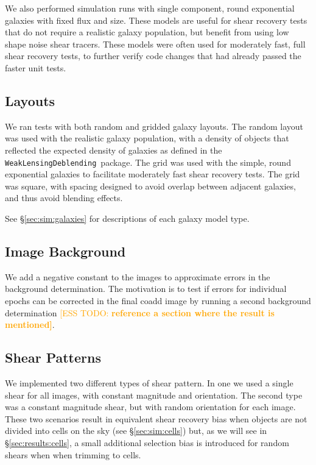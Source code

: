 \documentclass[twocolumn,twocolappendix,astrosym]{openjournal}
\newcommand{\esstodo}[1]{\textcolor{orange}{[ESS TODO: \bf #1]}}
\newcommand{\descwl}{\texttt{WeakLensingDeblending}}
\begin{document}
We also performed simulation runs with single component, round exponential
galaxies with fixed flux and size.  These models are useful for shear recovery
tests that do not require a realistic galaxy population, but benefit from using
low shape noise shear tracers.  These models were often used for moderately
fast, full shear recovery tests, to further verify code changes that had
already passed the faster unit tests.

\subsection{Layouts} \label{sec:sim:layouts}

We ran tests with both random and gridded galaxy layouts.  The random layout
was used with the realistic galaxy population, with a density of objects that
reflected the expected density of galaxies as defined in the \descwl\ package.
The grid was used with the simple, round exponential galaxies to facilitate
moderately fast shear recovery tests.  The grid was square, with spacing
designed to avoid overlap between adjacent galaxies, and thus avoid blending
effects.

See \S \ref{sec:sim:galaxies} for descriptions of each galaxy model type.

\subsection{Image Background} \label{sec:sim:bgerr}

We add a negative constant to the images to approximate errors in the
background determination.  The motivation is to test if errors for individual
epochs can be corrected in the final coadd image by running a second background
determination \esstodo{reference a section where the result is mentioned}.

\subsection{Shear Patterns} \label{sec:sim:shears}

We implemented two different types of shear pattern.  In one we used a single
shear for all images, with constant magnitude and orientation.  The second type
was a constant magnitude shear, but with random orientation for each image.
These two scenarios result in equivalent shear recovery bias when objects are
not divided into cells on the sky (see \S \ref{sec:sim:cells}) but, as we will
see in \S \ref{sec:results:cells}, a small additional selection bias is
introduced for random shears when when trimming to cells.
\end{document}

